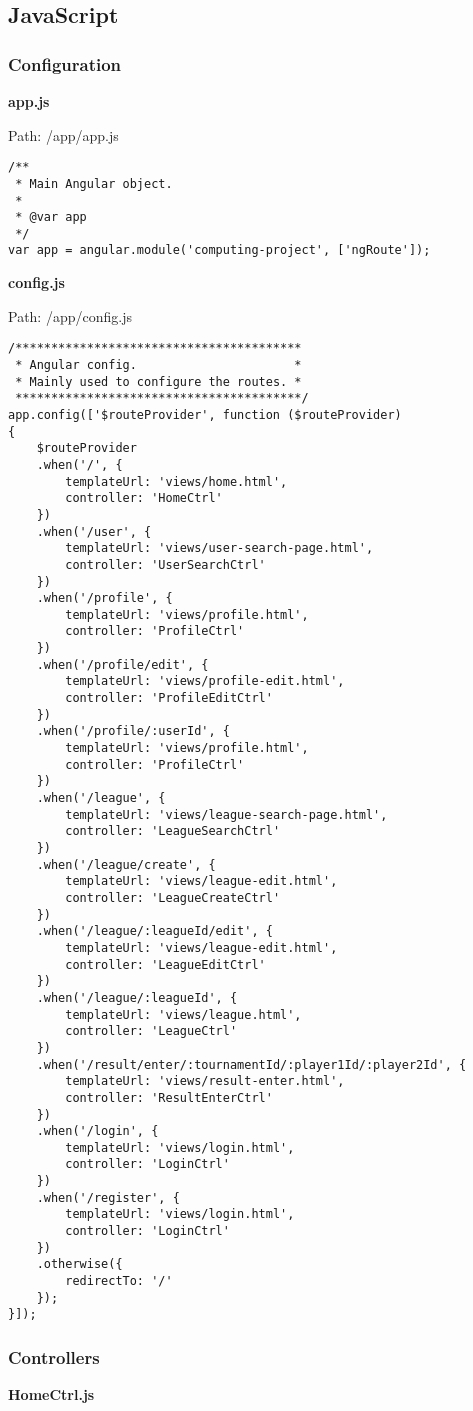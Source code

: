 \subsection{JavaScript}
\subsubsection{Configuration}
\textbf{app.js}

Path: /app/app.js
{\scriptsize
\begin{lstlisting}
/**
 * Main Angular object.
 *
 * @var app
 */
var app = angular.module('computing-project', ['ngRoute']);\end{lstlisting}
}
\textbf{config.js}

Path: /app/config.js
{\scriptsize
\begin{lstlisting}
/****************************************
 * Angular config.                      *
 * Mainly used to configure the routes. *
 ****************************************/
app.config(['$routeProvider', function ($routeProvider)
{
	$routeProvider
	.when('/', {
		templateUrl: 'views/home.html',
		controller: 'HomeCtrl'
	})
	.when('/user', {
		templateUrl: 'views/user-search-page.html',
		controller: 'UserSearchCtrl'
	})
	.when('/profile', {
		templateUrl: 'views/profile.html',
		controller: 'ProfileCtrl'
	})
	.when('/profile/edit', {
		templateUrl: 'views/profile-edit.html',
		controller: 'ProfileEditCtrl'
	})
	.when('/profile/:userId', {
		templateUrl: 'views/profile.html',
		controller: 'ProfileCtrl'
	})
	.when('/league', {
		templateUrl: 'views/league-search-page.html',
		controller: 'LeagueSearchCtrl'
	})
	.when('/league/create', {
		templateUrl: 'views/league-edit.html',
		controller: 'LeagueCreateCtrl'
	})
	.when('/league/:leagueId/edit', {
		templateUrl: 'views/league-edit.html',
		controller: 'LeagueEditCtrl'
	})
	.when('/league/:leagueId', {
		templateUrl: 'views/league.html',
		controller: 'LeagueCtrl'
	})
	.when('/result/enter/:tournamentId/:player1Id/:player2Id', {
		templateUrl: 'views/result-enter.html',
		controller: 'ResultEnterCtrl'
	})
	.when('/login', {
		templateUrl: 'views/login.html',
		controller: 'LoginCtrl'
	})
	.when('/register', {
		templateUrl: 'views/login.html',
		controller: 'LoginCtrl'
	})
	.otherwise({
		redirectTo: '/'
	});
}]);\end{lstlisting}
}
\subsubsection{Controllers}
\textbf{HomeCtrl.js}


